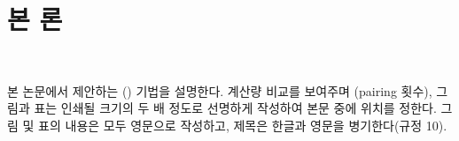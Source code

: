 
\section{본 론}
~

본 논문에서 제안하는 \model(\modelfull) 기법을 설명한다.
 계산량 비교를 보여주며 (\eg pairing 횟수),
그림과 표는 인쇄될 크기의 두 배 정도로 선명하게 작성하여 본문 중에 위치를
정한다. 그림 및 표의 내용은 모두 영문으로 작성하고, 제목은 한글과 영문을
병기한다(규정 10).


\begin{figure}[t]
\centering
\fbox{\rule{0pt}{2.5cm}\rule{0.85\columnwidth}{0pt}}%
\end{figure}